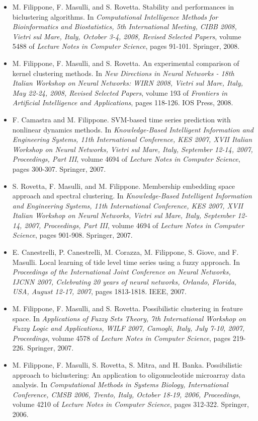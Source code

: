 \begin{itemize}
\item  M. Filippone, F. Masulli, and S. Rovetta. Stability and performances in biclustering algorithms. In \emph{Computational Intelligence Methods for Bioinformatics and Biostatistics, 5th International Meeting, CIBB 2008, Vietri sul Mare, Italy, October 3-4, 2008, Revised Selected Papers}, volume 5488 of \emph{Lecture Notes in Computer Science}, pages 91-101. Springer, 2008.  
\item  M. Filippone, F. Masulli, and S. Rovetta. An experimental comparison of kernel clustering methods. In \emph{New Directions in Neural Networks - 18th Italian Workshop on Neural Networks: WIRN 2008, Vietri sul Mare, Italy, May 22-24, 2008, Revised Selected Papers}, volume 193 of \emph{Frontiers in Artificial Intelligence and Applications}, pages 118-126. IOS Press, 2008.  
\item  F. Camastra and M. Filippone. SVM-based time series prediction with nonlinear dynamics methods. In \emph{Knowledge-Based Intelligent Information and Engineering Systems, 11th International Conference, KES 2007, XVII Italian Workshop on Neural Networks, Vietri sul Mare, Italy, September 12-14, 2007, Proceedings, Part III}, volume 4694 of \emph{Lecture Notes in Computer Science}, pages 300-307. Springer, 2007.  
\item  S. Rovetta, F. Masulli, and M. Filippone. Membership embedding space approach and spectral clustering. In \emph{Knowledge-Based Intelligent Information and Engineering Systems, 11th International Conference, KES 2007, XVII Italian Workshop on Neural Networks, Vietri sul Mare, Italy, September 12-14, 2007, Proceedings, Part III}, volume 4694 of \emph{Lecture Notes in Computer Science}, pages 901-908. Springer, 2007.  
\item  E. Canestrelli, P. Canestrelli, M. Corazza, M. Filippone, S. Giove, and F. Masulli. Local learning of tide level time series using a fuzzy approach. In \emph{Proceedings of the International Joint Conference on Neural Networks, IJCNN 2007, Celebrating 20 years of neural networks, Orlando, Florida, USA, August 12-17, 2007}, pages 1813-1818. IEEE, 2007.  
\item  M. Filippone, F. Masulli, and S. Rovetta. Possibilistic clustering in feature space. In \emph{Applications of Fuzzy Sets Theory, 7th International Workshop on Fuzzy Logic and Applications, WILF 2007, Camogli, Italy, July 7-10, 2007, Proceedings}, volume 4578 of \emph{Lecture Notes in Computer Science}, pages 219-226. Springer, 2007.  
\item  M. Filippone, F. Masulli, S. Rovetta, S. Mitra, and H. Banka. Possibilistic approach to biclustering: An application to oligonucleotide microarray data analysis. In \emph{Computational Methods in Systems Biology, International Conference, CMSB 2006, Trento, Italy, October 18-19, 2006, Proceedings}, volume 4210 of \emph{Lecture Notes in Computer Science}, pages 312-322. Springer, 2006.  

\end{itemize}
